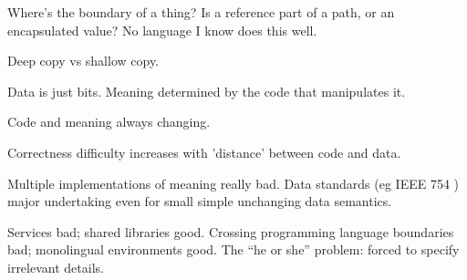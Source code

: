 Where's the boundary of a thing? 
Is a reference part of a path, or
an encapsulated value?
No language I know does this well.

Deep copy vs shallow copy.

Data is just bits. 
Meaning determined by the code that manipulates it. 

Code and meaning always changing.

Correctness difficulty increases
with 'distance' between code and data. 

Multiple implementations of meaning really bad.
Data standards (eg IEEE 754 \cite{Higham2002ASNA, IEEE:1985:AIS,
P754:2008:ISF, Muller-et-al-2010}) major undertaking even for
small simple unchanging data semantics.

Services bad; shared libraries good.
Crossing programming language boundaries bad; 
monolingual environments \cite{Heering:1985:TMP:3318.3321} good.
The ``he or she'' problem: forced to specify irrelevant details.
